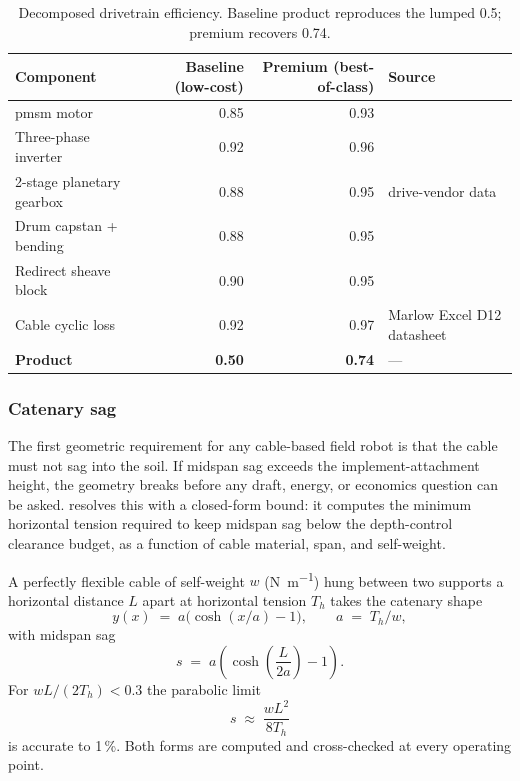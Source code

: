 \documentclass[11pt,a4paper]{article}
\begin{document}
\begin{table}[H]
\centering\small
\caption{Decomposed drivetrain efficiency. Baseline product reproduces the lumped 0.5; premium recovers 0.74.}\label{tab:eta-decomposition}
\begin{tabularx}{\textwidth}{Xrrl}
\toprule
Component & Baseline (low-cost) & Premium (best-of-class) & Source \\
\midrule
\gls{pmsm} motor              & 0.85 & 0.93 & \cite{asabe-ep496} \\
Three-phase inverter           & 0.92 & 0.96 & \cite{asabe-ep496} \\
2-stage planetary gearbox      & 0.88 & 0.95 & drive-vendor data \\
Drum capstan + bending         & 0.88 & 0.95 & \cite{feyrer2015wireropes} \\
Redirect sheave block          & 0.90 & 0.95 & \cite{feyrer2015wireropes} \\
Cable cyclic loss              & 0.92 & 0.97 & Marlow Excel D12 datasheet \\
\midrule
\textbf{Product}               & \textbf{0.50} & \textbf{0.74} & --- \\
\bottomrule
\end{tabularx}
\end{table}

\subsubsection{Catenary sag}\label{sec:catenary}

The first geometric requirement for any cable-based field robot is that the cable must not sag into the soil. If midspan sag exceeds the implement-attachment height, the geometry breaks before any draft, energy, or economics question can be asked.  resolves this with a closed-form bound: it computes the minimum horizontal tension required to keep midspan sag below the depth-control clearance budget, as a function of cable material, span, and self-weight.

A perfectly flexible cable of self-weight $w$ (\si{\newton\per\meter}) hung between two supports a horizontal distance $L$ apart at horizontal tension $T_h$ takes the catenary shape~\cite{irvine1981cables}
\begin{equation}\label{eq:catenary}
y(x) \;=\; a\bigl(\cosh(x/a)-1\bigr), \qquad a \;=\; T_h / w,
\end{equation}
with midspan sag
\begin{equation}\label{eq:sag-exact}
s \;=\; a\!\left(\cosh\!\left(\frac{L}{2a}\right) - 1\right).
\end{equation}
For $w L / (2 T_h) < 0.3$ the parabolic limit
\begin{equation}\label{eq:sag-parabolic}
s \;\approx\; \frac{w L^{2}}{8 T_h}
\end{equation}
is accurate to 1\,\%. Both forms are computed and cross-checked at every operating point.
\end{document}
